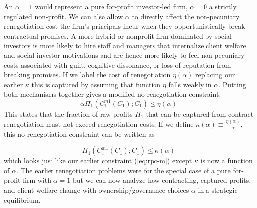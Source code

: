 \documentclass[11pt,english]{article}
\theoremstyle{plain}
\theoremstyle{definition}
\begin{document}
An $\alpha=1$
would represent a pure for-profit investor-led firm, $\alpha=0$ a
strictly regulated non-profit.
We can also allow $\alpha$ to directly affect the non-pecuniary renegotiation
cost the firm's principals incur when they opportunistically break
contractual promises. A more hybrid or nonprofit firm
dominated by social investors is more likely to hire staff and managers
that internalize client welfare and social investor motivations and
are hence more likely to feel non-pecuniary costs associated with
guilt, cognitive dissonance, or loss of reputation from breaking promises. If we label the cost of renegotiation $\eta\left(\alpha\right)$ \textendash{}
replacing our earlier $\kappa$ \textendash{} this is captured
by assuming that function $\eta$ falls weakly in $\alpha$. Putting
both mechanisms together gives a modified no-renegotiation constraint: 
\begin{equation}
\alpha\Pi_{1}(C_{1}^{m1}(C_{1});C_{1})\leq\eta(\alpha)\label{eq:no_reneg_np}
\end{equation}
This states that the fraction of raw profits
$\Pi_{1}$ that can be captured from  contract renegotiation must
not exceed renegotiation costs. If we define $\kappa(\alpha)\equiv\frac{\eta(\alpha)}{\alpha}$, this
no-renegotiation constraint can be written as

\begin{equation}
\Pi_{1}(C_{1}^{m1}(C_{1});C_{1})\leq\kappa(\alpha)\label{eq:no-kalpha}
\end{equation}
which looks just like our earlier constraint (\ref{eq:rpc-m}) except $\kappa$
is now a function of $\alpha$. The earlier renegotiation problems
were for the special case of a pure for-profit firm with $\alpha=1$
but we can now analyze how contracting, captured profits, and client welfare
change with ownership/governance choices  $\alpha$  in a strategic equilibrium.
\end{document}
